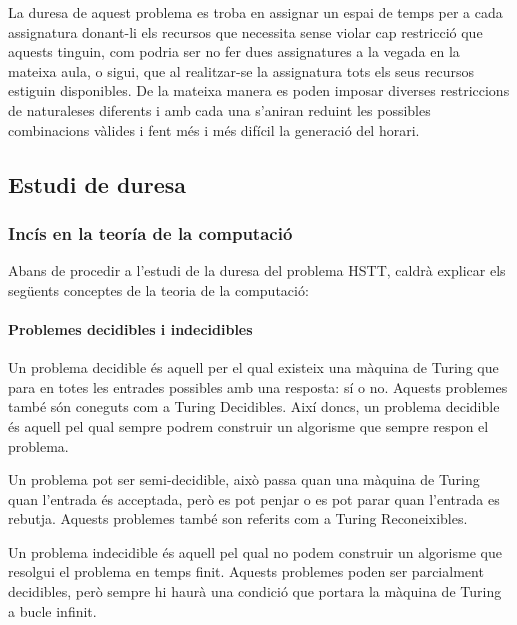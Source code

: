 \documentclass[11pt,a4paper,twoside]{report}
\begin{document}
    La duresa de aquest problema es troba en assignar un espai de temps per a cada assignatura donant-li els recursos que necessita sense violar cap restricció que aquests tinguin, 
    com podria ser no fer dues assignatures a la vegada en la mateixa aula, o sigui, que al realitzar-se la assignatura tots els seus recursos estiguin disponibles.  
    De la mateixa manera es poden imposar diverses restriccions de naturaleses diferents i amb cada una s'aniran reduint les possibles combinacions vàlides i fent més i més difícil la generació del horari.
    \subsection{Estudi de duresa}

    

    \subsubsection{Incís en la teoría de la computació}
    Abans de procedir a l'estudi de la duresa del problema HSTT, caldrà explicar els següents conceptes de la teoria de la computació: 
    \paragraph*{Problemes decidibles i indecidibles}

    Un problema decidible és aquell per el qual existeix una màquina de Turing que para en totes les entrades possibles amb una resposta: sí o no. Aquests problemes també són coneguts com a Turing Decidibles. 
    Així doncs, un problema decidible és aquell pel qual sempre podrem construir un algorisme que sempre respon el problema.
    
    Un problema pot ser semi-decidible, això passa quan una màquina de Turing quan l'entrada és acceptada, però es pot penjar o es pot parar quan l'entrada es rebutja. Aquests problemes també son referits com a Turing Reconeixibles.
    
    Un problema indecidible és aquell pel qual no podem construir un algorisme que resolgui el problema en temps finit. Aquests problemes poden ser parcialment decidibles, però sempre hi haurà una condició que portara la màquina de Turing a bucle infinit.
\end{document}
